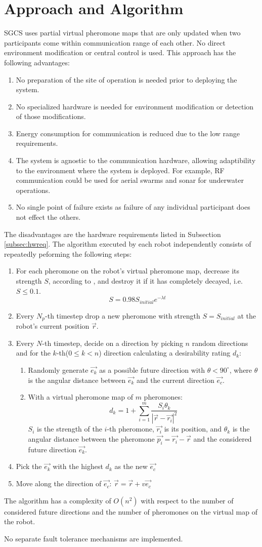 \section{Approach and Algorithm}
\label{sec:alg}
SGCS uses partial virtual pheromone maps that are only updated when two participants come within communication range of each other. No direct environment modification or central control is used. This approach has the following advantages: 
\begin{enumerate}
\item No preparation of the site of operation is needed prior to deploying the system.
\item No specialized hardware is needed for environment modification or detection of those modifications.
\item Energy consumption for communication is reduced due to the low range requirements.
\item The system is agnostic to the communication hardware, allowing adaptibility to the environment where the system is deployed. For example, RF communication could be used for aerial swarms and sonar for underwater operations.
\item No single point of failure exists as failure of any individual participant does not effect the others.
\end{enumerate}
The disadvantages are the hardware requirements listed in Subsection \ref{subsec:hwreq}.
The algorithm executed by each robot independently consists of repeatedly peforming the following steps:
	\begin{enumerate}
		\item For each pheromone on the robot's virtual pheromone map, decrease its strength $S$, according to \parencite{robinson_decay_2008}, and destroy it if it has completely decayed, i.e. $S\leq0.1$. 
			$$S=0.98 S_{initial} e^{-\lambda t}$$
		\item Every $N_p$-th timestep drop a new pheromone with strength $S=S_{initial}$ at the robot's current position $\vec{r}$.
		\item Every $N$-th timestep, decide on a direction by picking $n$ random directions and for the $k$-th($0\le k<n$) direction calculating a desirability rating $d_k$:
		\begin{enumerate}
			\item Randomly generate $\vec{e_k}$ as a possible future direction with $\theta < 90^{\circ}$, where $\theta$ is the angular distance between $\vec{e_k}$ and the current direction $\vec{e_{c}}$.
			\item With a virtual pheromone map of $m$ pheromones: 
				$$d_k = 1 + \sum_{i=1}^m {\frac{S_i \theta_k}{|\vec{r}-\vec{r_{i}}|^2}}$$ 
				$S_i$ is the strength of the $i$-th pheromone, $\vec{r_{i}}$ is its position, and $\theta_k$ is the angular distance between the pheromone $\vec{p_i}=\vec{r_i} - \vec{r}$ and the considered future direction $\vec{e_k}$.
		\end{enumerate}
	\item Pick the $\vec{e_k}$ with the highest $d_k$ as the new $\vec{e_c}$
	\item Move along the direction of $\vec{e_c}$: $\vec{r} = \vec{r} + v\vec{e_c}$
	\end{enumerate}
\par The algorithm has a complexity of $O(n^2)$ with respect to the number of considered future directions and the number of pheromones on the virtual map of the robot. 
\par No separate fault tolerance mechanisms are implemented.

